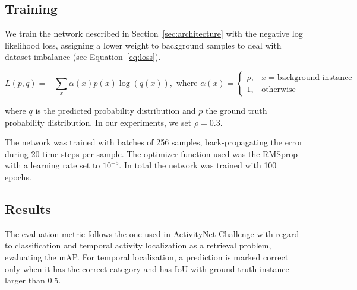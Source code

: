 \documentclass{article}
\begin{document}
\subsection{Training}
We train the network described in Section~\ref{sec:architecture} with the negative log likelihood loss, assigning a lower weight to background samples to deal with dataset imbalance (see Equation~\ref{eq:loss}).

\begin{equation}
    L(p,q) = - \sum_x \alpha(x) p(x) \log (q(x)), \text{ where } \alpha(x) =
    \begin{cases}
        \rho, & x = \text{background instance}\\
        1,    & \text{otherwise}
    \end{cases}
    \label{eq:loss}
\end{equation}

where $q$ is the predicted probability distribution and $p$ the ground truth probability distribution. In our experiments, we set $\rho = 0.3$.

The network was trained with batches of 256 samples, back-propagating the error during 20 time-steps per sample.
The optimizer function used was the RMSprop~\cite{dauphin2015rmsprop} with a learning rate set to $10^{-5}$. In total the network was trained with 100 epochs.



\subsection{Results}
\label{sec:resultats}

The evaluation metric follows the one used in ActivityNet Challenge with regard to classification and temporal activity localization as a retrieval problem, evaluating the mAP.
For temporal localization, a prediction is marked correct only when it has the correct category and has IoU with ground truth instance larger than $0.5$.
\end{document}
